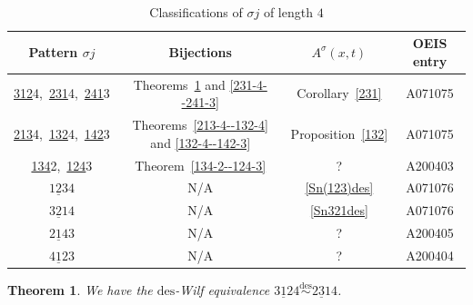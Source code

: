 \documentclass[11pt,reqno]{amsart}
\numberwithin{equation}{section}
\theoremstyle{plain}
\newtheorem{theorem}{Theorem}[section]
\theoremstyle{definition}
\def\des{\mathrm{des}}
\begin{document}
\begin{table}[h!]
\setlength{\tabcolsep}{9pt}  
\renewcommand{\arraystretch}{1.2}  
 \begin{center}
 \begin{tabular}{c|c|c|c} 
 Pattern $\sigma j$ & Bijections & $A^{\sigma}(x,t)$ & OEIS entry\\ \hline
 \underline{312}4,\ \underline{231}4,\ \underline{241}3 & Theorems~\ref{312-4--231-4} and \ref{231-4--241-3} & Corollary~\ref{231} & A071075 \\
 \underline{213}4,\ \underline{132}4,\ \underline{142}3 & Theorems~\ref{213-4--132-4} and \ref{132-4--142-3} & Proposition~\ref{132} & A071075\\
 \underline{134}2,\ \underline{124}3 & Theorem~\ref{134-2--124-3} & ? & A200403 \\
 $\underline{123}4$ & N/A & \eqref{Sn(123)des} & A071076 \\ 
 $\underline{321}4$ & N/A & \eqref{Sn321des} & A071076 \\
 $\underline{214}3$ & N/A & ? & A200405 \\ 
 $\underline{412}3$ & N/A & ? & A200404
 \end{tabular}
 \end{center}
 \caption{Classifications of $\sigma j$ of length $4$}
 \label{tab: classifications of length 4}
\end{table}

\begin{theorem}\label{312-4--231-4}
  We have the $\des$-Wilf equivalence $\underline{312}4 \overset{\des}{\sim }\underline{231}4$. 
\end{theorem}
\end{document}
